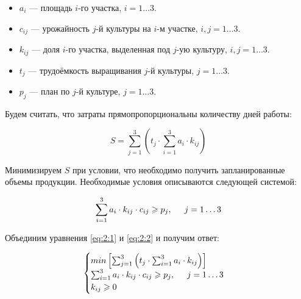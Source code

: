 \begin{itemize}

	\item $a_i$ --- площадь $i$-го участка, $i = 1 \dots 3$.
	
	\item $c_{ij}$ --- урожайность $j$-й культуры на $i$-м участке, $i, j = 1 \dots 3$.

	\item $k_{ij}$ --- доля $i$-го участка, выделенная под $j$-ую культуру,  $i, j = 1 \dots 3$.
	
	\item $t_j$ --- трудоёмкость выращивания $j$-й культуры, $j = 1 \dots 3$.

	\item $p_j$ --- план по $j$-й культуре, $j = 1 \dots 3$.

\end{itemize}

Будем считать, что затраты прямопропорциональны количеству дней работы:

\begin{equation}
	\label{eq:2:1}
	S = \sum_{j = 1}^{3} \left( t_j \cdot \sum_{i = 1}^{3} a_i \cdot k_{ij} \right)
\end{equation} 

Минимизируем $S$ при условии, что необходимо получить запланированные объемы продукции. Необходимые условия описываются следующей системой:

\begin{equation}
	\label{eq:2:2}
	\sum_{i = 1}^{3} a_i \cdot k_{ij} \cdot c_{ij} \geq p_j, \hspace{5mm} j = 1 \dots 3
\end{equation}

Объединим уравнения \ref{eq:2:1} и \ref{eq:2:2} и получим ответ:

\begin{equation}
\label{eq:2:3}
\begin{cases}
	min \left[ \sum_{j = 1}^{3} \left( t_j \cdot \sum_{i = 1}^{3} a_i \cdot k_{ij} \right) \right] \\
	\sum_{i = 1}^{3} a_i \cdot k_{ij} \cdot c_{ij} \geq p_j, \hspace{5mm} j = 1 \dots 3 \\
	k_{ij} \geq 0
\end{cases}
\end{equation}


